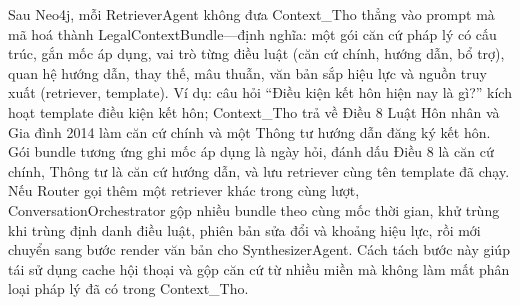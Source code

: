 \documentclass[../DoAn.tex]{subfiles}
\begin{document}
Sau Neo4j, mỗi RetrieverAgent không đưa Context\_Tho thẳng vào prompt mà mã hoá thành LegalContextBundle---định nghĩa: một gói căn cứ pháp lý có cấu trúc, gắn mốc áp dụng, vai trò từng điều luật (căn cứ chính, hướng dẫn, bổ trợ), quan hệ hướng dẫn, thay thế, mâu thuẫn, văn bản sắp hiệu lực và nguồn truy xuất (retriever, template). Ví dụ: câu hỏi ``Điều kiện kết hôn hiện nay là gì?'' kích hoạt template điều kiện kết hôn; Context\_Tho trả về Điều 8 Luật Hôn nhân và Gia đình 2014 làm căn cứ chính và một Thông tư hướng dẫn đăng ký kết hôn. Gói bundle tương ứng ghi mốc áp dụng là ngày hỏi, đánh dấu Điều 8 là căn cứ chính, Thông tư là căn cứ hướng dẫn, và lưu retriever cùng tên template đã chạy. Nếu Router gọi thêm một retriever khác trong cùng lượt, ConversationOrchestrator gộp nhiều bundle theo cùng mốc thời gian, khử trùng khi trùng định danh điều luật, phiên bản sửa đổi và khoảng hiệu lực, rồi mới chuyển sang bước render văn bản cho SynthesizerAgent. Cách tách bước này giúp tái sử dụng cache hội thoại và gộp căn cứ từ nhiều miền mà không làm mất phân loại pháp lý đã có trong Context\_Tho.
\end{document}
